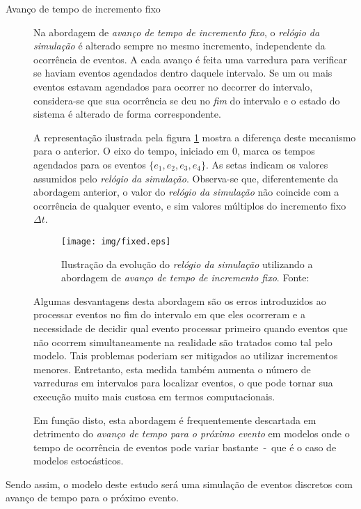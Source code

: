 \begin{description}
\item[Avanço de tempo de incremento fixo] \hfill

Na abordagem de \textit{avanço de tempo de incremento fixo}, o \textit{relógio
da simulação} é alterado sempre no mesmo incremento, independente da ocorrência
de eventos. A cada avanço é feita uma varredura para verificar se haviam eventos
agendados dentro daquele intervalo. Se um ou mais eventos estavam agendados para
ocorrer no decorrer do intervalo, considera-se que sua ocorrência se deu no
\textit{fim} do intervalo e o estado do sistema é alterado de forma
correspondente.

A representação ilustrada pela figura \ref{fig:fixedtime} mostra a diferença
deste mecanismo para o anterior. O eixo do tempo, iniciado em 0, marca os tempos
agendados para os eventos $\{e_{1}, e_{2}, e_{3}, e_{4}\}$. As setas indicam os
valores assumidos pelo \textit{relógio da simulação}. Observa-se que,
diferentemente da abordagem anterior, o valor do \textit{relógio da simulação}
não coincide com a ocorrência de qualquer evento, e sim valores múltiplos do
incremento fixo $\Delta t$.

\begin{figure}[htb!]
\centering\texttt{[image: img/fixed.eps]}
\caption[Avanço de tempo de incremento fixo]{\label{fig:fixedtime}Ilustração da evolução do \textit{relógio da simulação} utilizando a abordagem de \textit{avanço de tempo de incremento fixo}. Fonte:~\cite{Law}}
\end{figure}

Algumas desvantagens desta abordagem são os erros introduzidos ao processar
eventos no fim do intervalo em que eles ocorreram e a necessidade de decidir
qual evento processar primeiro quando eventos que não ocorrem simultaneamente na
realidade são tratados como tal pelo modelo. Tais problemas poderiam ser
mitigados ao utilizar incrementos menores. Entretanto, esta medida também
aumenta o número de varreduras em intervalos para localizar eventos, o que pode
tornar sua execução muito mais custosa em termos computacionais.

Em função disto, esta abordagem é frequentemente descartada em detrimento do
\textit{avanço de tempo para o próximo evento} em modelos onde o tempo de
ocorrência de eventos pode variar bastante~-~que é o caso de modelos
estocásticos.

\end{description}

Sendo assim, o modelo deste estudo será uma simulação de eventos discretos com avanço de tempo para o próximo evento.

